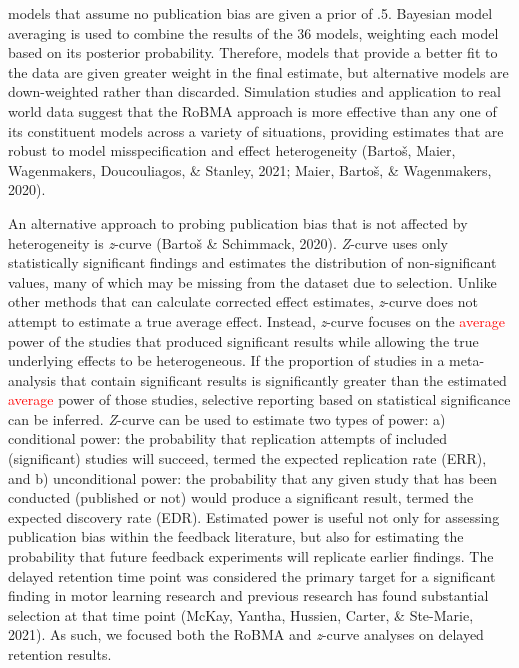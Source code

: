 \documentclass[
  english,
  man, donotrepeattitle,mask,floatsintext]{apa7}
\begin{document}
models that assume no publication bias are given a prior of .5. Bayesian model averaging is used to combine the results of the 36 models, weighting each model based on its posterior probability. Therefore, models that provide a better fit to the data are given greater weight in the final estimate, but alternative models are down-weighted rather than discarded. Simulation studies and application to real world data suggest that the RoBMA approach is more effective than any one of its constituent models across a variety of situations, providing estimates that are robust to model misspecification and effect heterogeneity (Bartoš, Maier, Wagenmakers, Doucouliagos, \& Stanley, 2021; Maier, Bartoš, \& Wagenmakers, 2020).

An alternative approach to probing publication bias that is not affected by heterogeneity is \emph{z}-curve (Bartoš \& Schimmack, 2020). \emph{Z}-curve uses only statistically significant findings and estimates the distribution of non-significant values, many of which may be missing from the dataset due to selection. Unlike other methods that can calculate corrected effect estimates, \emph{z}-curve does not attempt to estimate a true average effect. Instead, \emph{z}-curve focuses on the \textcolor{red}{average} power of the studies that produced significant results while allowing the true underlying effects to be heterogeneous. If the proportion of studies in a meta-analysis that contain significant results is significantly greater than the estimated \textcolor{red}{average} power of those studies, selective reporting based on statistical significance can be inferred. \emph{Z}-curve can be used to estimate two types of power: a) conditional power: the probability that replication attempts of included (significant) studies will succeed, termed the expected replication rate (ERR), and b) unconditional power: the probability that any given study that has been conducted (published or not) would produce a significant result, termed the expected discovery rate (EDR). Estimated power is useful not only for assessing publication bias within the feedback literature, but also for estimating the probability that future feedback experiments will replicate earlier findings. The delayed retention time point was considered the primary target for a significant finding in motor learning research and previous research has found substantial selection at that time point (McKay, Yantha, Hussien, Carter, \& Ste-Marie, 2021). As such, we focused both the RoBMA and \emph{z}-curve analyses on delayed retention results.
\end{document}
